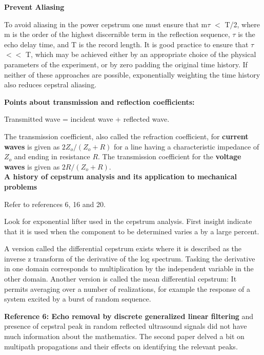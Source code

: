 \documentclass[12pt, a4paper]{report}
\begin{document}
\textbf{Prevent Aliasing}

To avoid aliasing in the power cepstrum one must ensure that m$\tau$ $<$ T/2, where m is the order of the highest discernible term in the reflection sequence, $\tau$ is the echo delay time, and T is the record length. It is good practice to ensure that $\tau$ $<<$ T, which may be achieved either by an appropriate choice of the physical parameters of the experiment, or by zero padding the original time history. If neither of these approaches are possible, exponentially weighting the time history also reduces cepstral aliasing.

\textbf{Points about transmission and reflection coefficients:}

Transmitted wave = incident wave + reflected wave.

The transmission coefficient, also called the refraction coefficient, for \textbf{current waves} is given as $2Z_o / (Z_o + R)$ for a line having a characteristic impedance of $Z_o$ and ending in resistance $R$. The transmission coefficient for the \textbf{voltage waves} is given as $2R / (Z_o + R)$.\\

\textbf{A history of cepstrum analysis and its application to mechanical problems}

Refer to references 6, 16 and 20.

Look for exponential lifter used in the cepstrum analysis. First insight indicate that it is used when the component to be determined varies a by a large percent.

A version called the differential cepstrum exists where it is described as the inverse z transform of the derivative of the log spectrum. Tasking the derivative in one domain corresponds to multiplication by the independent variable in the other domain.
Another version is called the mean differential cepstrum: It permits averaging over a number of realizations, for example the response of a system excited by a burst of random sequence.

\textbf{Reference 6: Echo removal by discrete generalized linear filtering} and presence of cepstral peak in random reflected ultrasound signals did not have much information about the mathematics. The second paper delved a bit on multipath propagations and their effects on identifying the relevant peaks.
\end{document}
